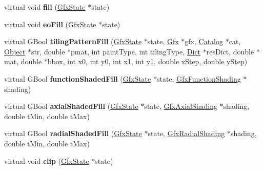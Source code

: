 \begin{DoxyCompactItemize}
\item 
\mbox{\label{class_pre_scan_output_dev_aaa8d96e0aad93f5c0f7319a7a1fdc359}} 
virtual void {\bfseries fill} (\hyperlink{class_gfx_state}{Gfx\+State} $\ast$state)
\item 
\mbox{\label{class_pre_scan_output_dev_a70ec069edbea12bd37d3933741a057c8}} 
virtual void {\bfseries eo\+Fill} (\hyperlink{class_gfx_state}{Gfx\+State} $\ast$state)
\item 
\mbox{\label{class_pre_scan_output_dev_a2f64f66ce0a0e1a974db933ed7336a47}} 
virtual G\+Bool {\bfseries tiling\+Pattern\+Fill} (\hyperlink{class_gfx_state}{Gfx\+State} $\ast$state, \hyperlink{class_gfx}{Gfx} $\ast$gfx, \hyperlink{class_catalog}{Catalog} $\ast$cat, \hyperlink{class_object}{Object} $\ast$str, double $\ast$pmat, int paint\+Type, int tiling\+Type, \hyperlink{class_dict}{Dict} $\ast$res\+Dict, double $\ast$mat, double $\ast$bbox, int x0, int y0, int x1, int y1, double x\+Step, double y\+Step)
\item 
\mbox{\label{class_pre_scan_output_dev_a99e44ff2d38c92c13cbfa77aa94531ce}} 
virtual G\+Bool {\bfseries function\+Shaded\+Fill} (\hyperlink{class_gfx_state}{Gfx\+State} $\ast$state, \hyperlink{class_gfx_function_shading}{Gfx\+Function\+Shading} $\ast$shading)
\item 
\mbox{\label{class_pre_scan_output_dev_a4a95480b91e33d8c97e24e19ba8f9860}} 
virtual G\+Bool {\bfseries axial\+Shaded\+Fill} (\hyperlink{class_gfx_state}{Gfx\+State} $\ast$state, \hyperlink{class_gfx_axial_shading}{Gfx\+Axial\+Shading} $\ast$shading, double t\+Min, double t\+Max)
\item 
\mbox{\label{class_pre_scan_output_dev_aab6b056cf498c906c9b5b561673d51fc}} 
virtual G\+Bool {\bfseries radial\+Shaded\+Fill} (\hyperlink{class_gfx_state}{Gfx\+State} $\ast$state, \hyperlink{class_gfx_radial_shading}{Gfx\+Radial\+Shading} $\ast$shading, double t\+Min, double t\+Max)
\item 
\mbox{\label{class_pre_scan_output_dev_ac834136a09a29c3b39e856030f47114a}} 
virtual void {\bfseries clip} (\hyperlink{class_gfx_state}{Gfx\+State} $\ast$state)

\end{DoxyCompactItemize}
